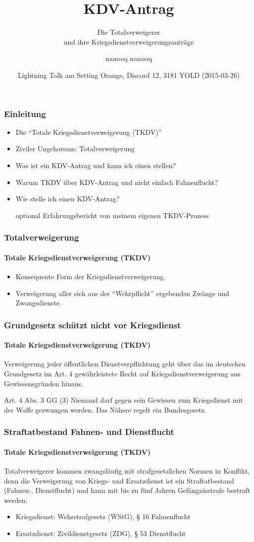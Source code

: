 \documentclass{beamer}
\title[KDV-Antrag] %
{KDV-Antrag}
\subtitle{Die Totalverweigerer \\und ihre Kriegsdienstverweigerungsanträge}
\author[nanooq nanooq] 
{nanooq nanooq}
\institute[Hackspace Siegen e.~V.] %
{
	\inst{1}%
	Hackspace Siegen e.~V.\\
	Effertsufer 104\\
	57072 Siegen
}
\date[2015-03-26] %
{Lightning Talk am Setting Orange, Discord 12, 3181 YOLD (2015-03-26)}
\begin{document}
	
	\frame{\titlepage}
	
	\begin{frame}
	  	\frametitle{Einleitung}	  
	  	\begin{itemize}
	  		\item Die \enquote{Totale Kriegsdienstverweigerung (TKDV)}
	  		\item Ziviler Ungehorsam: Totalverweigerung
	  		\item Was ist ein KDV-Antrag und kann ich einen stellen?
	  		\item Warum TKDV über KDV-Antrag und nicht einfach Fahnenflucht?
	  		\item Wie stelle ich einen KDV-Antrag?
		  	\item[optional] Erfahrungsbericht von meinem eigenen TKDV-Prozess
	  	\end{itemize}		
	\end{frame}

	\begin{frame}
	  	\frametitle{Totalverweigerung}
	  	\framesubtitle{Totale Kriegsdienstverweigerung (TKDV)}
	  	\begin{itemize}
	  		\item Konsequente Form der Kriegsdienstverweigerung. 		
	  		\item Verweigerung aller sich aus der \enquote{Wehrpflicht} ergebenden Zwänge und Zwangsdienste. 
	  	\end{itemize}
  	\end{frame}
  	
  	\begin{frame}
	  	\frametitle{Grundgesetz schützt nicht vor Kriegsdienst}
	  	\framesubtitle{Totale Kriegsdienstverweigerung (TKDV)}
	  	
	  	Verweigerung jeder öffentlichen Dienstverpflichtung geht über das im deutschen Grundgesetz im Art. 4 gewährleistete Recht auf Kriegsdienstverweigerung aus Gewissensgründen hinaus.

	  	\begin{block}{Art. 4 Abs. 3 GG}
	  		(3) Niemand darf gegen sein Gewissen zum Kriegsdienst mit der Waffe gezwungen werden. Das Nähere regelt ein Bundesgesetz.
	  	\end{block}
  	\end{frame}
	
	\begin{frame}
	  	\frametitle{Straftatbestand Fahnen- und Dienstflucht}
	  	\framesubtitle{Totale Kriegsdienstverweigerung (TKDV)}

	  	Totalverweigerer kommen zwangsläufig mit strafgesetzlichen Normen in Konflikt, denn die Verweigerung von Kriegs- und Ersatzdienst ist ein Straftatbestand (Fahnen-, Dienstflucht) und kann mit bis zu fünf Jahren Gefängnisstrafe bestraft werden:
	  	
	  	\begin{itemize}
	  		\item Kriegsdienst:  Wehrstrafgesetz (WStG), § 16 Fahnenflucht
	  		\item Ersatzdienst: Zivildienstgesetz (ZDG), § 53 Dienstflucht	  		
	  	\end{itemize}
	\end{frame}
		
\end{document}

